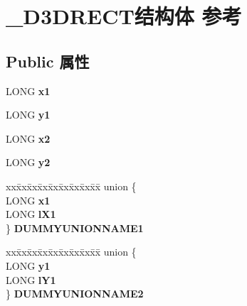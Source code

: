 \hypertarget{struct___d3_d_r_e_c_t}{}\section{\+\_\+\+D3\+D\+R\+E\+C\+T结构体 参考}
\label{struct___d3_d_r_e_c_t}
\subsection*{Public 属性}
\begin{DoxyCompactItemize}
\item 
\mbox{\label{struct___d3_d_r_e_c_t_a6d4087cc4b3addd7b5aca51a8a379841}} 
L\+O\+NG {\bfseries x1}
\item 
\mbox{\label{struct___d3_d_r_e_c_t_a7961a8796ba802007181475f6954e3e3}} 
L\+O\+NG {\bfseries y1}
\item 
\mbox{\label{struct___d3_d_r_e_c_t_ae1eba761a14cc4adf2227d5922bd719f}} 
L\+O\+NG {\bfseries x2}
\item 
\mbox{\label{struct___d3_d_r_e_c_t_a1e41d65c9738b37cdedfed07f389a85a}} 
L\+O\+NG {\bfseries y2}
\item 
\mbox{\label{struct___d3_d_r_e_c_t_a4536e4da79961cb810bb930dc50ad411}} 
\begin{tabbing}
xx\=xx\=xx\=xx\=xx\=xx\=xx\=xx\=xx\=\kill
union \{\\
\>LONG {\bfseries x1}\\
\>LONG {\bfseries lX1}\\
\} {\bfseries DUMMYUNIONNAME1}\\

\end{tabbing}\item 
\mbox{\label{struct___d3_d_r_e_c_t_a88e47a0b1bc1e28d0fcdbd6652e1293c}} 
\begin{tabbing}
xx\=xx\=xx\=xx\=xx\=xx\=xx\=xx\=xx\=\kill
union \{\\
\>LONG {\bfseries y1}\\
\>LONG {\bfseries lY1}\\
\} {\bfseries DUMMYUNIONNAME2}\\


\end{tabbing}
\end{DoxyCompactItemize}
